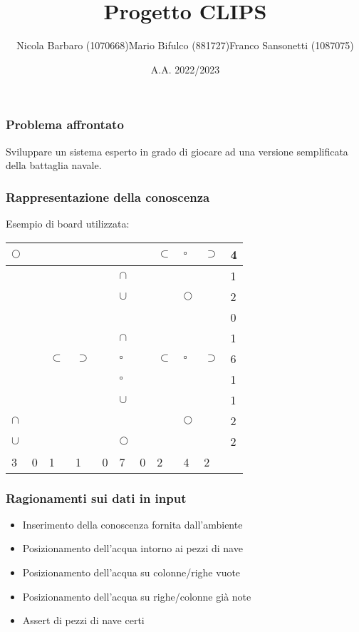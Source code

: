 \documentclass[11pt]{beamer}
\author[Barbaro, Bifulco, Sansonetti]{\small Nicola Barbaro (1070668)\linebreak Mario Bifulco (881727)\linebreak Franco Sansonetti (1087075)}
\title{Progetto CLIPS}
\date{A.A. 2022/2023}
\institute[]{Università degli studi di Torino\\Intelligenza Artificiale e Laboratorio}
\begin{document}
\begin{frame}
\titlepage
\end{frame}


\begin{frame}
    \frametitle{Problema affrontato}
    Sviluppare un sistema esperto in grado di giocare ad una versione semplificata della battaglia navale.
\end{frame}

\begin{frame}
    \frametitle{Rappresentazione della conoscenza}
    Esempio di board utilizzata:
    \begin{table}
        \begin{tabular}{|l|l|l|l|l|l|l|l|l|l||l|}
        \hline
         $\Circle$ &  &  &  &  &  &  & $\subset$ & $\square$ & $\supset$ & 4 \\ \hline
         &  &  &  &  & $\cap$ &  &  &  &  & 1 \\ \hline
         &  &  &  &  & $\cup$ &  &  & $\Circle$ &  & 2 \\ \hline
         &  &  &  &  &  &  &  &  &  & 0 \\ \hline
         &  &  &  &  & $\cap$ &  &  &  &  & 1 \\ \hline
         &  & $\subset$ & $\supset$ &  & $\square$ &  & $\subset$ & $\square$ & $\supset$ & 6 \\ \hline
         &  &  &  &  & $\square$ &  &  &  &  & 1 \\ \hline
         &  &  &  &  & $\cup$ &  &  &  &  & 1 \\ \hline
         $\cap$ &  &  &  &  &  &  &  & $\Circle$ &  & 2 \\ \hline
         $\cup$ &  &  &  &  & $\Circle$ &  &  &  &  & 2 \\ \hline \hline
         3 & 0 & 1 & 1 & 0 & 7 & 0 & 2 & 4 & 2 & \\ \hline
        \end{tabular}
    \end{table}
\end{frame}

\begin{frame}
    \frametitle{Ragionamenti sui dati in input}
    \begin{itemize}
        \item Inserimento della conoscenza fornita dall'ambiente
        \item Posizionamento dell'acqua intorno ai pezzi di nave
        \item Posizionamento dell'acqua su colonne/righe vuote
        \item Posizionamento dell'acqua su righe/colonne già note
        \item Assert di pezzi di nave certi
    \end{itemize}
\end{frame}
\end{document}
